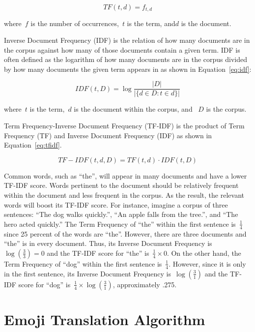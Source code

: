 \documentclass{article}[10]
\begin{document}
\begin{equation}
  TF(t, d) = f_{t, d} \label{eq:tf}
\end{equation}

where~\(f\) is the number of occurrences,~\(t\) is the term, and\(d\) is the document.

Inverse Document Frequency (IDF) is the relation of how many documents are in the corpus against how many of those documents contain a given term. IDF is often defined as the logarithm of how many documents are in the corpus divided by how many documents the given term appears in as shown in Equation~\eqref{eq:idf}:

\begin{equation}
  IDF(t, D) = \log\frac{|D|}{|\{d \in D : t \in d\}|} \label{eq:idf}
\end{equation}

where~\(t\) is the term,~\(d\) is the document within the corpus, and ~\(D\) is the corpus.

Term Frequency-Inverse Document Frequency (TF-IDF) is the product of Term Frequency (TF) and Inverse Document Frequency (IDF) as shown in Equation~\eqref{eq:tfidf}.

\begin{equation}
  TF-IDF(t, d, D) = TF(t, d) \cdot IDF(t, D) \label{eq:tfidf}
\end{equation}

Common words, such as ``the'', will appear in many documents and have a lower TF-IDF score. Words pertinent to the document should be relatively frequent within the document and less frequent in the corpus. As the result, the relevant words will boost its TF-IDF score. For instance, imagine a corpus of three sentences: ``The dog walks quickly.'', ``An apple falls from the tree.'', and ``The hero acted quickly.'' The Term Frequency of ``the'' within the first sentence is~\(\frac{1}{4}\) since 25 percent of the words are ``the''. However, there are three documents and ``the'' is in every document. Thus, its Inverse Document Frequency is~\( \log(\frac{3}{3}) = 0 \) and the TF-IDF score for ``the'' is~\(\frac{1}{4} \times 0\). On the other hand, the Term Frequency of ``dog'' within the first sentence is~\(\frac{1}{4}\). However, since it is only in the first sentence, its Inverse Document Frequency is~\(\log(\frac{3}{1})\) and the TF-IDF score for ``dog'' is~\(\frac{1}{4} \times \log(\frac{3}{1})\), approximately .275.

\section{Emoji Translation Algorithm\label{sec:EmojiTranslationAlgorithm}}
\end{document}
